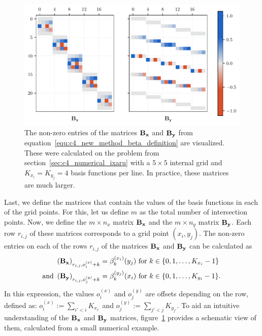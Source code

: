 \begin{figure}
    \begin{center}
        \includegraphics[width=\textwidth]{img/chapter4/new_method_beta.pdf}
        \caption{The non-zero entries of the matrices $\vb{B_x}$ and $\vb{B_y}$ from equation~\eqref{equ:c4_new_method_beta_definition} are visualized. These were calculated on the problem from section~\ref{sec:c4_numerical_ixaru} with a $5 \times 5$ internal grid and $K_{x_i} = K_{y_j} = 4$ basis functions per line. In practice, these matrices are much larger.}
        \label{fig:c4_new_method_beta}
    \end{center}
\end{figure}

Last, we define the matrices that contain the values of the basis functions in each of the grid points. For this, let us define $m$ as the total number of intersection points. Now, we define the $m \times n_x$ matrix $\vb{B_x}$ and the $m \times n_y$ matrix $\vb{B_y}$. Each row $r_{i,j}$ of these matrices corresponds to a grid point $(x_i, y_j)$. The non-zero entries on each of the rows $r_{i,j}$ of the matrices $\vb{B_x}$ and $\vb{B_y}$ can be calculated as
\begin{align}
    \left(\vb{B_x}\right)_{r_{i,j}, o^{(x)}_{i} + k} & =  \beta_{k}^{(x_i)}(y_j) \text{ for $k \in \{0, 1, \dots, K_{x_i} - 1\}$ }   \nonumber                               \\
    \text{and }
    \left(\vb{B_y}\right)_{r_{i,j}, o^{(y)}_{j} + k} & =  \beta_{k}^{(y_j)}(x_i) \text{ for $k \in \{0, 1, \dots, K_{y_i} - 1\}$.} \label{equ:c4_new_method_beta_definition}
\end{align}
In this expression, the values $o^{(x)}_{i}$ and $o^{(y)}_{j}$ are offsets depending on the row, defined as: $o^{(x)}_{i} := \sum_{i' < i} K_{x_{i'}}$ and $o^{(y)}_{j} := \sum_{j' < j} K_{y_{j'}}$. To aid an intuitive understanding of the $\vb{B_x}$ and $\vb{B_y}$ matrices, figure~\ref{fig:c4_new_method_beta} provides a schematic view of them, calculated from a small numerical example.

